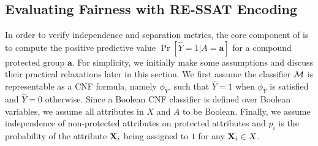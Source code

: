 \subsection{Evaluating Fairness with RE-SSAT Encoding}
\label{fairness_justicia_sec:enumeration_ssat}
In order to verify independence and separation metrics, the core component of {\justicia} is to compute the positive predictive value $\Pr[\hat{Y} = 1 | A = \mathbf{a}]$ for a compound protected group $\mathbf{a}$.  For simplicity, we  initially make some assumptions and discuss their practical relaxations later in this section.   
We first assume the classifier $\mathcal{M}$ is representable as a CNF formula, namely $\phi_{\hat{Y}}$, such that $ \hat{Y} = 1 $ when $ \phi_{\hat{Y}}$ is satisfied and  $\hat{Y} =0$ otherwise. Since a Boolean CNF classifier is defined over Boolean variables, we  assume all attributes in $X$ and $A$ to be Boolean. Finally, we assume independence of non-protected attributes on protected attributes and $p_i $ is the  probability of the attribute $ \mathbf{X}_i $ being assigned to $ 1 $ for any  $\mathbf{X}_i \in X  $. 

